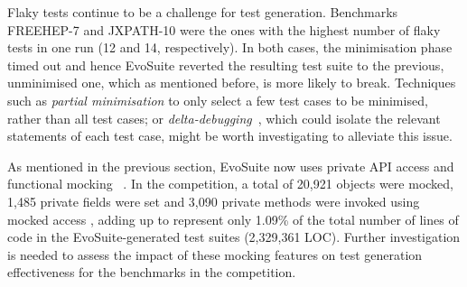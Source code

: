 \documentclass[10pt,conference]{IEEEtran}
\newcommand{\EVOSUITE}{{\sc EvoSuite}\xspace}
\newcommand{\TODO}[1]{\sethlcolor{yellow}\textbf{\textcolor{ScarletRed}{\hl{TODO: #1}}}\xspace}
\begin{document}

Flaky tests continue to be a challenge for test generation. Benchmarks
FREEHEP-7 and JXPATH-10 were the ones with the highest number of flaky
tests in one run (12 and 14, respectively). In both cases, the
minimisation phase timed out and hence \EVOSUITE reverted the
resulting test suite to the previous, unminimised one, which as
mentioned before, is more likely to break. Techniques such as
\textit{partial minimisation} to only select a few test cases to be
minimised, rather than all test cases; or
\textit{delta-debugging}~\cite{zellerdd}, which could isolate the
relevant statements of each test case, might be worth investigating
to alleviate this issue.

As mentioned in the previous section, \EVOSUITE now uses private
API access and functional mocking%
~\cite{ICST_Mocking17}. In the competition, a total of 20,921
objects were mocked, 1,485 private fields were set and 3,090 private methods
were invoked using mocked access%
, adding up to represent only 1.09\% of the total number of lines of code
in the \EVOSUITE-generated test suites (2,329,361 LOC). Further
investigation is needed to assess the impact of these mocking features
on test generation effectiveness for the benchmarks in the
competition.
\end{document}
